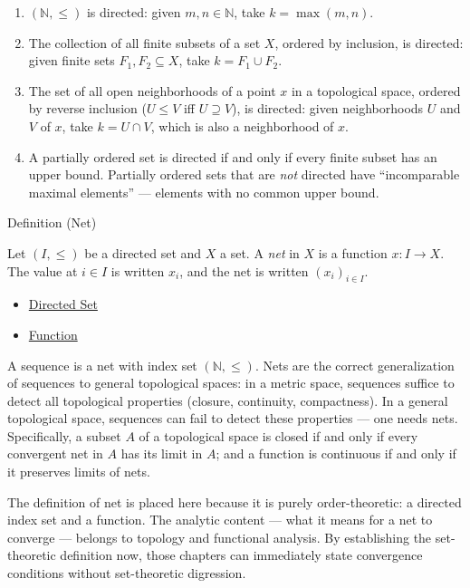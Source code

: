 \begin{example*}
\begin{enumerate}[label=(\roman*)]
\item $(\mathbb{N}, \leq)$ is directed: given $m, n \in \mathbb{N}$, take
$k = \max(m,n)$.
\item The collection of all finite subsets of a set $X$, ordered by inclusion,
is directed: given finite sets $F_1, F_2 \subseteq X$, take $k = F_1 \cup
F_2$.
\item The set of all open neighborhoods of a point $x$ in a topological space,
ordered by reverse inclusion ($U \leq V$ iff $U \supseteq V$), is directed:
given neighborhoods $U$ and $V$ of $x$, take $k = U \cap V$, which is also
a neighborhood of $x$.
\item A partially ordered set is directed if and only if every finite subset
has an upper bound. Partially ordered sets that are \emph{not} directed have
``incomparable maximal elements'' --- elements with no common upper bound.
\end{enumerate}
\end{example*}

\begin{definitionbox}{Definition (Net)}
\begin{definition}[Net]\label{def:net}
Let $(I, \leq)$ be a directed set and $X$ a set. A \emph{net} in $X$ is a
function $x : I \to X$. The value at $i \in I$ is written $x_i$, and the
net is written $(x_i)_{i \in I}$.
\end{definition}
\end{definitionbox}

\begin{dependencies}
\begin{itemize}
  \item \hyperref[def:directed-set]{Directed Set}
  \item \hyperref[def:function]{Function}
\end{itemize}
\end{dependencies}

\begin{remark*}
A sequence is a net with index set $(\mathbb{N}, \leq)$. Nets are the correct
generalization of sequences to general topological spaces: in a metric space,
sequences suffice to detect all topological properties (closure, continuity,
compactness). In a general topological space, sequences can fail to detect
these properties --- one needs nets. Specifically, a subset $A$ of a
topological space is closed if and only if every convergent net in $A$ has
its limit in $A$; and a function is continuous if and only if it preserves
limits of nets.

The definition of net is placed here because it is purely order-theoretic:
a directed index set and a function. The analytic content --- what it means
for a net to converge --- belongs to topology and functional analysis. By
establishing the set-theoretic definition now, those chapters can immediately
state convergence conditions without set-theoretic digression.
\end{remark*}
